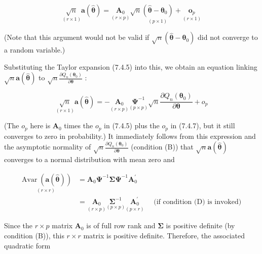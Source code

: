 \documentclass[10pt]{article}
\begin{document}
\begin{equation*}
\underset{(r \times 1)}{\sqrt{n}} \mathbf{a}(\hat{\boldsymbol{\theta}})=\underset{(r \times p)}{\mathbf{A}_{0}} \sqrt{n} \underset{(p \times 1)}{\left(\hat{\boldsymbol{\theta}}-\boldsymbol{\theta}_{0}\right)}+\underset{(r \times 1)}{\boldsymbol{o}_{p}} \tag{7.4.7}
\end{equation*}


(Note that this argument would not be valid if $\sqrt{n}\left(\hat{\boldsymbol{\theta}}-\boldsymbol{\theta}_{0}\right)$ did not converge to a random variable.)

Substituting the Taylor expansion (7.4.5) into this, we obtain an equation linking $\sqrt{n} \mathbf{a}(\hat{\boldsymbol{\theta}})$ to $\sqrt{n} \frac{\partial Q_{n}\left(\boldsymbol{\theta}_{0}\right)}{\partial \boldsymbol{\theta}}$ :


\begin{equation*}
\underset{(r \times 1)}{\sqrt{n}} \mathbf{a}(\hat{\boldsymbol{\theta}})=-\underset{(r \times p)}{\mathbf{A}_{0}} \underset{(p \times p)}{\mathbf{\Psi}^{-1}} \sqrt{n} \frac{\partial Q_{n}\left(\boldsymbol{\theta}_{0}\right)}{\partial \boldsymbol{\theta}}+o_{p} \tag{7.4.8}
\end{equation*}


(The $o_{p}$ here is $\mathbf{A}_{0}$ times the $o_{p}$ in (7.4.5) plus the $o_{p}$ in (7.4.7), but it still converges to zero in probability.) It immediately follows from this expression and the asymptotic normality of $\sqrt{n} \frac{\partial Q_{n}\left(\boldsymbol{\theta}_{0}\right)}{\partial \boldsymbol{\theta}}$ (condition (B)) that $\sqrt{n} \mathbf{a}(\hat{\boldsymbol{\theta}})$ converges to a normal distribution with mean zero and


\begin{align*}
\underset{(r \times r)}{\operatorname{Avar}(\mathbf{a}(\hat{\boldsymbol{\theta}}))} & =\mathbf{A}_{0} \boldsymbol{\Psi}^{-1} \boldsymbol{\Sigma} \boldsymbol{\Psi}^{-1} \mathbf{A}_{0}^{\prime} \\
& =\underset{(r \times p)}{\mathbf{A}_{0}} \underset{(p \times p)}{\boldsymbol{\Sigma}^{-1}} \underset{(p \times r)}{\mathbf{A}_{0}^{\prime}} \quad \text { (if condition (D) is invoked) } \tag{7.4.9}
\end{align*}


Since the $r \times p$ matrix $\mathbf{A}_{0}$ is of full row rank and $\boldsymbol{\Sigma}$ is positive definite (by condition (B)), this $r \times r$ matrix is positive definite. Therefore, the associated quadratic form
\end{document}
